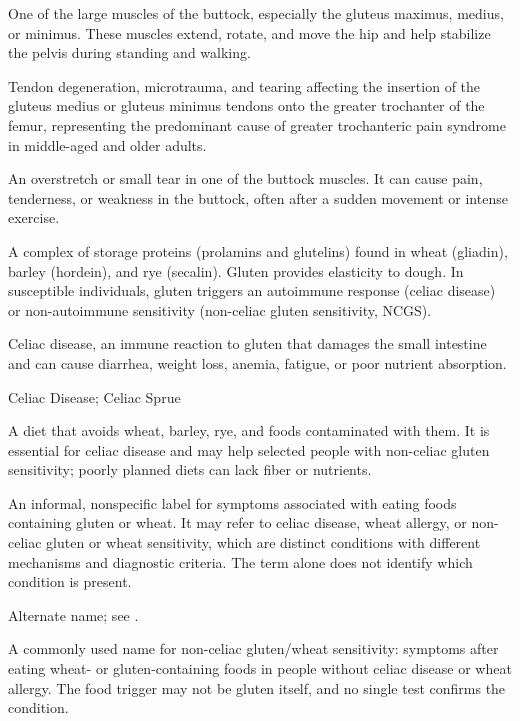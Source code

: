  One of the large muscles of the buttock, especially the gluteus maximus, medius, or minimus. These muscles extend, rotate, and move the hip and help stabilize the pelvis during standing and walking.

 Tendon degeneration, microtrauma, and tearing affecting the insertion of the gluteus medius or gluteus minimus tendons onto the greater trochanter of the femur, representing the predominant cause of greater trochanteric pain syndrome in middle-aged and older adults.

 An overstretch or small tear in one of the buttock muscles. It can cause pain, tenderness, or weakness in the buttock, often after a sudden movement or intense exercise.

 A complex of storage proteins (prolamins and glutelins) found in wheat (gliadin), barley
(hordein), and rye (secalin). Gluten provides elasticity to dough. In susceptible
individuals, gluten triggers an autoimmune response (celiac disease) or non-autoimmune
sensitivity (non-celiac gluten sensitivity, NCGS).

 Celiac disease, an immune reaction to gluten that damages the small intestine and can cause diarrhea, weight loss, anemia, fatigue, or poor nutrient absorption.

\synonyms
Celiac Disease; Celiac Sprue

 A diet that avoids wheat, barley, rye, and foods contaminated with them. It is essential for celiac disease and may help selected people with non-celiac gluten sensitivity; poorly planned diets can lack fiber or nutrients.

 An informal, nonspecific label for symptoms associated with eating foods containing gluten or wheat.
It may refer to celiac disease, wheat allergy, or non-celiac gluten or wheat sensitivity, which are distinct conditions with different mechanisms and diagnostic criteria.
The term alone does not identify which condition is present.

 Alternate name; see .

 A commonly used name for non-celiac gluten/wheat sensitivity: symptoms after eating wheat- or gluten-containing foods in people without celiac disease or wheat allergy. The food trigger may not be gluten itself, and no single test confirms the condition.

